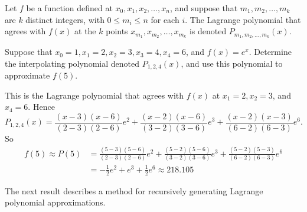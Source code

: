 \begin{definition}
Let $f$ be a function defined at $x_{0}, x_{1}, x_{2}, \ldots, x_{n}$, and suppose that $m_{1}, m_{2}, \ldots, m_{k}$ are $k$ distinct integers, with $0 \leq m_{i} \leq n$ for each $i$. The Lagrange polynomial that agrees with $f(x)$ at the $k$ points $x_{m_{1}}, x_{m_{2}}, \ldots, x_{m_{k}}$ is denoted $P_{m_{1}, m_{2}, \ldots, m_{k}}(x)$.
\end{definition}

\begin{example}\label{example:numb2}
Suppose that $x_{0}=1, x_{1}=2, x_{2}=3, x_{3}=4, x_{4}=6$, and $f(x)=e^{x}$. Determine the interpolating polynomial denoted $P_{1,2,4}(x)$, and use this polynomial to approximate $f(5)$.
\end{example}

\begin{mysolution}
This is the Lagrange polynomial that agrees with $f(x)$ at $x_{1}=2, x_{2}=3$, and $x_{4}=6$. Hence
\[P_{1,2,4}(x)=\frac{(x-3)(x-6)}{(2-3)(2-6)} e^{2}+\frac{(x-2)(x-6)}{(3-2)(3-6)} e^{3}+\frac{(x-2)(x-3)}{(6-2)(6-3)} e^{6}.\]
So
\[\begin{aligned}
f(5) \approx P(5) & =\frac{(5-3)(5-6)}{(2-3)(2-6)} e^{2}+\frac{(5-2)(5-6)}{(3-2)(3-6)} e^{3}+\frac{(5-2)(5-3)}{(6-2)(6-3)} e^{6} \\
& =-\frac{1}{2} e^{2}+e^{3}+\frac{1}{2} e^{6} \approx 218.105
\end{aligned}\]
\end{mysolution}

The next result describes a method for recursively generating Lagrange polynomial approximations.

